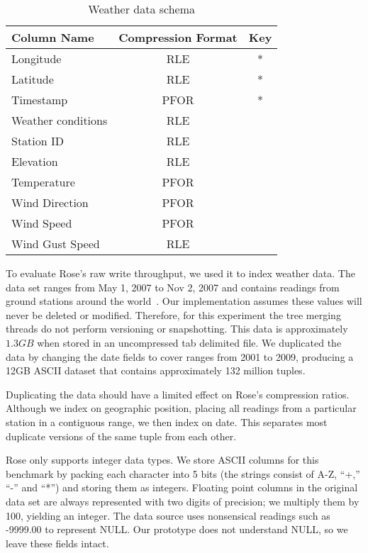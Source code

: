 \documentclass{vldb}
\newcommand{\rows}{Rose\xspace}
\newcommand{\rowss}{Rose's\xspace}
\begin{document}
\begin{table}
\caption{Weather data schema}
\centering
\label{tab:schema}
\begin{tabular}{|l|c|c|} \hline
Column Name     & Compression Format &  Key \\ \hline
Longitude       & RLE       & *       \\ \hline
Latitude        & RLE       & *       \\\hline
Timestamp       & PFOR       & *       \\\hline
Weather conditions& RLE       &        \\\hline
Station ID        & RLE       &        \\\hline
Elevation        & RLE       &        \\\hline
Temperature      & PFOR       &        \\\hline
Wind Direction        & PFOR       &        \\\hline
Wind Speed        & PFOR       &        \\\hline
Wind Gust Speed   & RLE       &        \\
\hline\end{tabular}
\end{table}

To evaluate \rowss raw write throughput, we used it to index
weather data.  The data set ranges from May 1,
2007 to Nov 2, 2007 and contains readings from ground stations around
the world~\cite{nssl}.  Our implementation assumes these values will never be deleted or modified.  Therefore, for this experiment the tree merging threads do not perform versioning or snapshotting.  This data is approximately $1.3GB$ when stored in an
uncompressed tab delimited file.  We duplicated the data by changing
the date fields to cover ranges from 2001 to 2009, producing a 12GB
ASCII dataset that contains approximately 132 million tuples.

Duplicating the data should have a limited effect on \rowss
compression ratios.  Although we index on geographic position, placing
all readings from a particular station in a contiguous range, we then
index on date.  This separates most duplicate versions of the same tuple
from each other.

\rows only supports integer data types.  We store ASCII columns for this benchmark by
packing each character into 5 bits (the strings consist of
A-Z, ``+,'' ``-'' and ``*'') and storing them as integers.  Floating point columns in
the original data set are always represented with two digits of precision;
we multiply them by 100, yielding an integer.  The data source uses
nonsensical readings such as -9999.00 to represent NULL.  Our
prototype does not understand NULL, so we leave these fields intact.
\end{document}
